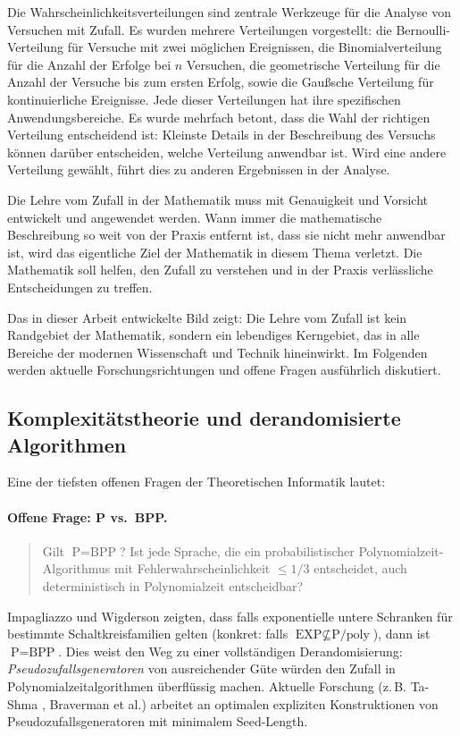 ﻿\documentclass[12pt,a4paper]{article}
\theoremstyle{definition}
\theoremstyle{plain}
\theoremstyle{remark}
\begin{document}
Die Wahrscheinlichkeitsverteilungen sind zentrale Werkzeuge für die Analyse
von Versuchen mit Zufall. Es wurden mehrere Verteilungen vorgestellt: die
Bernoulli-Verteilung für Versuche mit zwei möglichen Ereignissen, die
Binomialverteilung für die Anzahl der Erfolge bei $n$ Versuchen, die
geometrische Verteilung für die Anzahl der Versuche bis zum ersten Erfolg,
sowie die Gaußsche Verteilung für kontinuierliche Ereignisse. Jede dieser
Verteilungen hat ihre spezifischen Anwendungsbereiche. Es wurde mehrfach
betont, dass die Wahl der richtigen Verteilung entscheidend ist: Kleinste
Details in der Beschreibung des Versuchs können darüber entscheiden, welche
Verteilung anwendbar ist. Wird eine andere Verteilung gewählt, führt dies
zu anderen Ergebnissen in der Analyse.

Die Lehre vom Zufall in der Mathematik muss mit Genauigkeit und Vorsicht
entwickelt und angewendet werden. Wann immer die mathematische Beschreibung
so weit von der Praxis entfernt ist, dass sie nicht mehr anwendbar ist, wird
das eigentliche Ziel der Mathematik in diesem Thema verletzt. Die Mathematik
soll helfen, den Zufall zu verstehen und in der Praxis verlässliche
Entscheidungen zu treffen.

Das in dieser Arbeit entwickelte Bild zeigt: Die Lehre vom Zufall ist kein
Randgebiet der Mathematik, sondern ein lebendiges Kerngebiet, das in alle
Bereiche der modernen Wissenschaft und Technik hineinwirkt. Im Folgenden
werden aktuelle Forschungsrichtungen und offene Fragen ausführlich diskutiert.

\subsection{Komplexitätstheorie und derandomisierte Algorithmen}

Eine der tiefsten offenen Fragen der Theoretischen Informatik lautet:

\paragraph*{Offene Frage: P vs.\ BPP.}
\begin{quote}
  Gilt $\text{P} = \text{BPP}$? Ist jede Sprache, die ein
  probabilistischer Polynomialzeit-Algorithmus mit Fehlerwahrscheinlichkeit
  $\leq 1/3$ entscheidet, auch deterministisch in Polynomialzeit entscheidbar?
\end{quote}

Impagliazzo und Wigderson \cite{impagliazzo1997p} zeigten, dass falls
exponentielle untere Schranken für bestimmte Schaltkreisfamilien gelten
(konkret: falls $\text{EXP} \not\subseteq \text{P/poly}$), dann ist
$\text{P} = \text{BPP}$. Dies weist den Weg zu einer vollständigen
Derandomisierung: \emph{Pseudozufallsgeneratoren} von ausreichender Güte
würden den Zufall in Polynomialzeitalgorithmen überflüssig machen. Aktuelle
Forschung (z.\,B. Ta-Shma \cite{tashma2017explicit}, Braverman et al.)
arbeitet an optimalen expliziten Konstruktionen von
Pseudozufallsgeneratoren mit minimalem Seed-Length.
\end{document}
